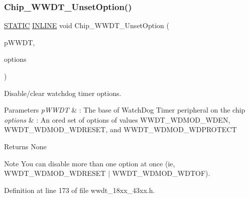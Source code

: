 \subsubsection{\texorpdfstring{Chip\+\_\+\+W\+W\+D\+T\+\_\+\+Unset\+Option()}{Chip\_WWDT\_UnsetOption()}}
{\footnotesize\ttfamily \hyperlink{group___l_p_c___types___public___macros_ga10b2d890d871e1489bb02b7e70d9bdfb}{S\+T\+A\+T\+IC} \hyperlink{spifi__18xx__43xx_8h_a2eb6f9e0395b47b8d5e3eeae4fe0c116}{I\+N\+L\+I\+NE} void Chip\+\_\+\+W\+W\+D\+T\+\_\+\+Unset\+Option (\begin{DoxyParamCaption}\item[{\hyperlink{struct_l_p_c___w_w_d_t___t}{L\+P\+C\+\_\+\+W\+W\+D\+T\+\_\+T} $\ast$}]{p\+W\+W\+DT,  }\item[{uint32\+\_\+t}]{options }\end{DoxyParamCaption})}



Disable/clear watchdog timer options. 


\begin{DoxyParams}{Parameters}
{\em p\+W\+W\+DT} & \+: The base of Watch\+Dog Timer peripheral on the chip \\
\hline
{\em options} & \+: An or\textquotesingle{}ed set of options of values W\+W\+D\+T\+\_\+\+W\+D\+M\+O\+D\+\_\+\+W\+D\+EN, W\+W\+D\+T\+\_\+\+W\+D\+M\+O\+D\+\_\+\+W\+D\+R\+E\+S\+ET, and W\+W\+D\+T\+\_\+\+W\+D\+M\+O\+D\+\_\+\+W\+D\+P\+R\+O\+T\+E\+CT \\
\hline
\end{DoxyParams}
\begin{DoxyReturn}{Returns}
None 
\end{DoxyReturn}
\begin{DoxyNote}{Note}
You can disable more than one option at once (ie, W\+W\+D\+T\+\_\+\+W\+D\+M\+O\+D\+\_\+\+W\+D\+R\+E\+S\+ET $\vert$ W\+W\+D\+T\+\_\+\+W\+D\+M\+O\+D\+\_\+\+W\+D\+T\+OF). 
\end{DoxyNote}


Definition at line 173 of file wwdt\+\_\+18xx\+\_\+43xx.\+h.

